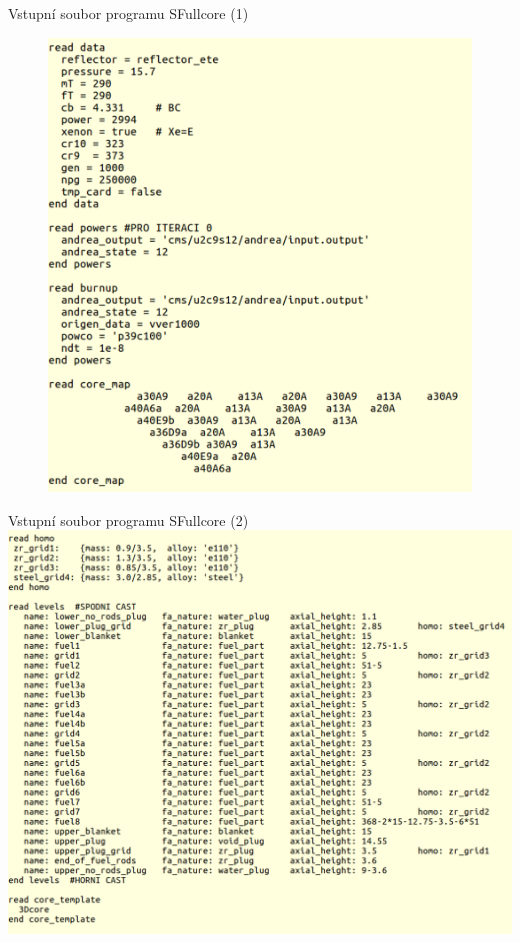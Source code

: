\documentclass{beamer}
\begin{document}
\begin{frame}{Vstupní soubor programu SFullcore (1)}
\begin{figure}
	\centering
	\includegraphics[scale=0.3]{img/input-example1.png}
\end{figure}
\end{frame}

\begin{frame}{Vstupní soubor programu SFullcore (2)}
	\centering
	\includegraphics[scale=0.25]{img/input-example2.png}
\end{frame}
\end{document}
